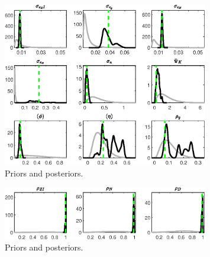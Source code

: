  
\begin{figure}[H]
\centering
\includegraphics[width=0.80\textwidth]{BRS_growth_ext_shopping/Output/BRS_growth_ext_shopping_PriorsAndPosteriors1}
\caption{Priors and posteriors.}\label{Fig:PriorsAndPosteriors:1}
\end{figure}
 
\begin{figure}[H]
\centering
\includegraphics[width=0.80\textwidth]{BRS_growth_ext_shopping/Output/BRS_growth_ext_shopping_PriorsAndPosteriors2}
\caption{Priors and posteriors.}\label{Fig:PriorsAndPosteriors:2}
\end{figure}
 
